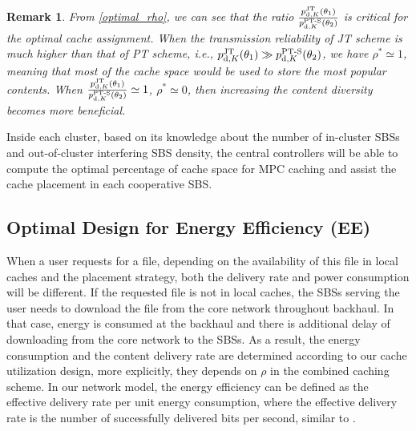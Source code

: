 \documentclass[twocolumns,10pt]{IEEEtran}
\newtheorem{remark}{Remark}
\begin{document}
\begin{remark}
From \eqref{optimal_rho}, we can see that the ratio $\frac{p_{\textnormal{d},K}^{\textnormal{JT}} (\theta_1) }{p_{\textnormal{d},K}^{\textnormal{PT-S}}(\theta_2)}$ is critical for the optimal cache assignment. When the transmission reliability of JT scheme is much higher than that of PT scheme, i.e., $p_{\textnormal{d},K}^{\textnormal{JT}} (\theta_1)\gg p_{\textnormal{d},K}^{\textnormal{PT-S}} (\theta_2)$, we have $\rho^{*} \simeq1$, meaning that most of the cache space would be used to store the most popular contents. When $\frac{p_{\textnormal{d},K}^{\textnormal{JT}} (\theta_1) }{p_{\textnormal{d},K}^{\textnormal{PT-S}}(\theta_2)}\simeq 1$, $\rho^{*} \simeq 0$, then increasing the content diversity becomes more beneficial. 
\end{remark}

Inside each cluster, based on its knowledge about the number of in-cluster SBSs and out-of-cluster interfering SBS density, the central controllers will be able to compute the optimal percentage of cache space for MPC caching and assist the cache placement in each cooperative SBS.


\subsection{Optimal Design for Energy Efficiency (EE)}
\label{ee_optimization}
When a user requests for a file, depending on the availability of this file in local caches and the placement strategy, both the delivery rate and power consumption will be different. 
If the requested file is not in local caches, the SBSs serving the user needs to download the file from the core network throughout backhaul.
In that case, energy is consumed at the backhaul and there is additional delay of downloading from the core network to the SBSs.
As a result, the energy consumption and the content delivery rate are determined according to our cache utilization design, more explicitly, they depends on $\rho$ in the combined caching scheme.
In our network model, the energy efficiency can be defined as
the effective delivery rate per unit energy consumption, where the effective delivery rate is the number of successfully delivered bits per second, similar to \cite{energy_efficiency}.
\end{document}
